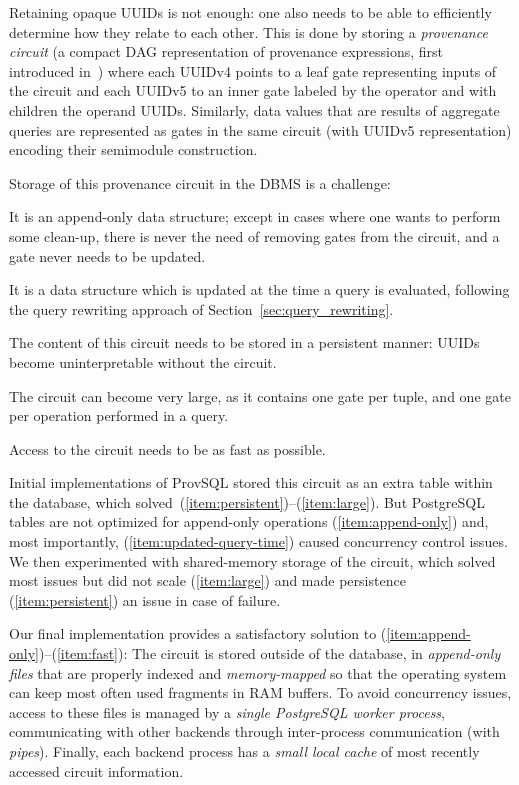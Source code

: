 Retaining opaque UUIDs is not enough: one also needs to be able to
efficiently determine how they relate to each other. This is done by
storing a \emph{provenance circuit} (a compact DAG representation of
provenance expressions, first introduced in~\cite{deutch2014circuits})
where each UUIDv4 points to a leaf gate representing inputs of the
circuit and each UUIDv5 to an inner gate labeled by the operator and with
children the operand UUIDs. Similarly, data values that are results of
aggregate queries are represented as gates in the same circuit (with
UUIDv5 representation) encoding their semimodule construction.

Storage of this provenance circuit in the
DBMS is a challenge:
\begin{asparaenum}[(i)]
	\item \label{item:append-only} It is an append-only data structure; except in cases where one
	wants to perform some clean-up, there is never the need of removing
	gates from the circuit, and a gate never needs to be updated.
	\item \label{item:updated-query-time} It is a data structure which is updated at the time a query is
	evaluated, following the query rewriting approach of
	Section~\ref{sec:query_rewriting}.
	\item \label{item:persistent} The content of this circuit needs to be stored in a persistent
	manner: UUIDs become uninterpretable without the circuit.
	\item \label{item:large} The circuit can become very large, as it
	contains one gate per tuple, and one gate
	per operation performed in a query.
	\item \label{item:fast} Access to the circuit needs to be as fast as
	possible.
\end{asparaenum}

Initial implementations of ProvSQL stored this circuit as an extra table
within the database, which
solved~(\ref{item:persistent})--(\ref{item:large}). But PostgreSQL
tables are not optimized for append-only operations
(\ref{item:append-only}) and, most importantly,
(\ref{item:updated-query-time}) caused concurrency control issues. We
then experimented with shared-memory storage of the circuit, which solved
most issues but did not scale (\ref{item:large}) and made persistence
(\ref{item:persistent}) an issue in case of failure.

Our final
implementation provides a satisfactory solution to (\ref{item:append-only})--(\ref{item:fast}):
The circuit is stored outside of the database, in \emph{append-only
	files} that
are properly indexed and \emph{memory-mapped} so that the operating
system can keep most
often used fragments in RAM buffers. To avoid concurrency issues, access to
these files is managed by a \emph{single PostgreSQL worker process},
communicating with other backends through
inter-process communication (with \emph{pipes}). Finally, each backend
process has a \emph{small local cache} of most recently accessed circuit information.

